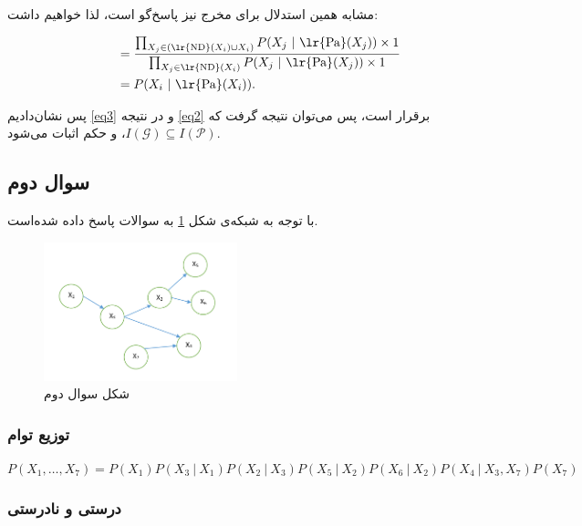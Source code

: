 \documentclass[11.5pt,a4paper]{article}
\begin{document}
مشابه همین استدلال برای مخرج نیز پاسخ‌گو است، لذا خواهیم داشت: 
\begin{spreadlines}{15pt}  
\begin{equation}
\begin{split}
\phantom{nothing} & = { {\prod_{X_j \in ( \text{\lr{ND}}(X_i) \cup X_i ) } P(X_j \ | \ \text{\lr{Pa}}(X_j)) \times 1 } \over {\prod_{X_j \in \text{\lr{ND}}(X_i) } P(X_j \ | \ \text{\lr{Pa}}(X_j)) \times 1 } } \\
	& = P(X_i \ | \ \text{\lr{Pa}}(X_i) ).
\end{split}
\end{equation}
\end{spreadlines}

پس نشان‌دادیم \ref{eq3} و در نتیجه \ref{eq2} برقرار است، پس می‌توان نتیجه گرفت که $\mathit{I}(\mathcal{G}) \subseteq \mathit{I}(\mathcal{P})$، و حکم اثبات می‌شود. 

\subsection{سوال دوم}
با توجه به شبکه‌ی شکل \ref{fig1} به سوالات پاسخ داده شده‌است.
\begin{figure}[h]
\centering
\includegraphics[width=0.5\textwidth]{4}
\caption{شکل سوال دوم}
\label{fig1}
\end{figure}

\subsubsection{توزیع توام}

$P(X_1, \dots , X_7) = P(X_1)P(X_3 \ | \ X_1)P(X_2 \ | \ X_3)P(X_5 \ | \ X_2)P(X_6 \ | \ X_2)P(X_4 \ | \ X_3 , X_7)P(X_7)$

\subsubsection{درستی و نادرستی}
\end{document}
